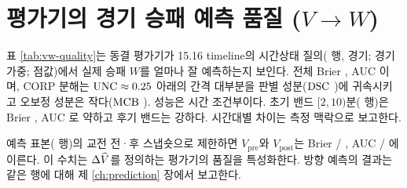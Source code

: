 \section{평가기의 경기 승패 예측 품질 ($V \to W$)}
\label{sec:value-vw}

표 \ref{tab:vw-quality}는 동결 평가기가 15.16 timeline의 시간상태 질의(\numVTest{} 행, \numVTestMatches{} 경기; 경기 가중; 점값)에서 실제 승패 $W$를 얼마나 잘 예측하는지 보인다. 전체 Brier \vwBrier{}, AUC \vwAUC{}이며, CORP 분해는 $\operatorname{UNC} \approx 0.25$ 아래의 간격 대부분을 판별 성분($\operatorname{DSC}$ \vwDSC{})에 귀속시키고 오보정 성분은 작다($\operatorname{MCB}$ \vwMCB{}). 성능은 시간 조건부이다. 초기 밴드 $[2,10)$분(\numVEarly{} 행)은 Brier \vwEarlyBrier{}, AUC \vwEarlyAUC{}로 약하고 후기 밴드는 강하다. 시간대별 차이는 측정 맥락으로 보고한다.



예측 표본(\numTTest{} 행)의 교전 전·후 스냅숏으로 제한하면 $V_{\mathrm{pre}}$와 $V_{\mathrm{post}}$는 Brier \vpreBrier{} / \vpostBrier{}, AUC \vpreAUC{} / \vpostAUC{}에 이른다. 이 수치는 $\Delta\widehat V$를 정의하는 평가기의 품질을 특성화한다. 방향 예측의 결과는 같은 행에 대해 제 \ref{ch:prediction} 장에서 보고한다.
